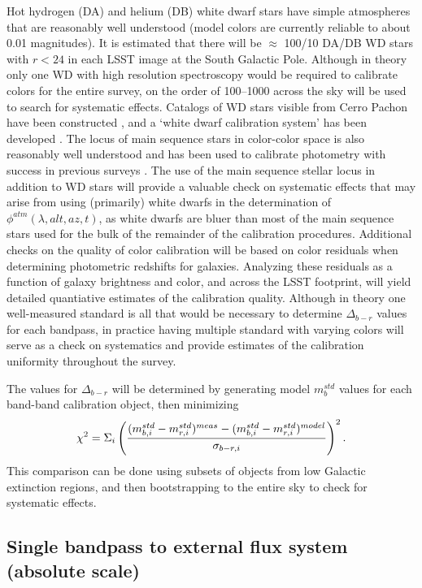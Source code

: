 \documentclass[12pt,preprint]{aastex}
\begin{document}
Hot hydrogen (DA) and helium (DB) white dwarf stars have simple
atmospheres that are reasonably well understood (model colors are
currently reliable to about 0.01 magnitudes). It is estimated that
there will be $\approx$ 100/10 DA/DB WD stars with $r<24$ in each LSST
image at the South Galactic Pole. Although in theory only one WD
with high resolution spectroscopy would be
required to calibrate colors for the entire survey, on the order of
100--1000 across the sky will be used to search for systematic effects.
Catalogs of WD stars visible from Cerro Pachon have been constructed
\citep{1992JRASC..86..309B, 2004AJ....128.3053B}, and a `white dwarf
calibration system' has been developed
\citep{2006AJ....132.1221H}. The locus of main sequence stars in
color-color space is also reasonably well understood and has been used
to calibrate photometry with success in previous surveys
\citep{2004MNRAS.352.1255M, Ivezic2007}. The use of the main
sequence stellar locus in addition to WD stars will provide a valuable
check on systematic effects that may arise from using (primarily)
white dwarfs in the determination of $\phi^{atm}(\lambda,alt,az,t)$,
as white dwarfs are bluer than most of the main sequence stars used
for the bulk of the remainder of the calibration procedures.
Additional checks on the quality of color calibration will be based on
color residuals when determining photometric redshifts for
galaxies. Analyzing these residuals as a function of galaxy brightness
and color, and across the LSST footprint, will yield detailed
quantiative estimates of the calibration quality.  Although in theory
one well-measured standard is all that would be necessary to determine
$\Delta_{b-r}$ values for each bandpass, in practice having multiple
standard with varying colors will serve as a check on systematics and
provide estimates of the calibration uniformity throughout the survey.

The values for $\Delta_{b-r}$ will be determined by generating model
$m_b^{std}$ values for each band-band calibration object, then
minimizing 
\begin{equation}
\chi^2 = \Sigma_{i} \left( { (m_{b,i}^{std} - m_{r,i}^{std})^{meas} - (m_{b,i}^{std}
    - m_{r,i}^{std})^{model} \over  \sigma_{b-r,i}}\right) ^2. 
\end{equation}
This comparison can
be done using subsets of objects from low Galactic extinction regions,
and then bootstrapping to the entire sky to check for systematic
effects. 

\subsection{Single bandpass to external flux system (absolute scale)}
\end{document}
